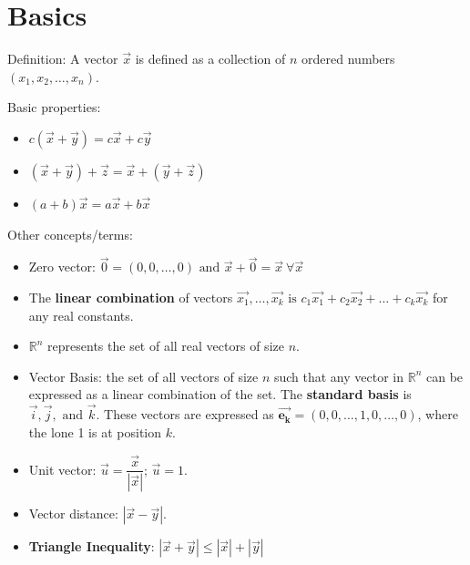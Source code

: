 \documentclass[11pt]{article}
\begin{document}
\section{Basics}
	Definition: A vector $\vec{x}$ is defined as a collection of $n$ ordered numbers $(x_1, x_2,\ldots ,x_n)$.
	
	Basic properties:
	\begin{itemize}
		\item $c(\vec{x} + \vec{y}) = c\vec{x} + c\vec{y}$
		\item $(\vec{x} + \vec{y}) + \vec{z} = \vec{x} + (\vec{y} + \vec{z})$
		\item $(a+b)\vec{x} = a\vec{x} + b\vec{x}$
	\end{itemize}
	
	Other concepts/terms:
	\begin{itemize}
		\item Zero vector: $\vec{0} = (0, 0,\ldots , 0) \text{ and } \vec{x} + \vec{0} = \vec{x} \ \forall \vec{x}$
		\item The \textbf{linear combination} of vectors $\vec{x_1}, \ldots , \vec{x_k} \text{ is } c_1\vec{x_1} + c_2\vec{x_2} + \ldots + c_k\vec{x_k}$ for any real constants.
		\item $\mathbb{R}^n$ represents the set of all real vectors of size $n$.
		\item Vector Basis: the set of all vectors of size $n$ such that any vector in $\mathbb{R}^n$ can be expressed as a linear combination of the set. The \textbf{standard basis} is $\vec{i}, \vec{j}, \text{ and } \vec{k}$. These vectors are expressed as $\mathbf{\vec{e_k}} = (0, 0, \ldots , 1, 0, \ldots ,0)$, where the lone 1 is at position $k$.
		\item Unit vector: $\vec{u}=\dfrac{\vec{x}}{|\vec{x}|}$; $\vec{u} = 1$.
		\item Vector distance: $|\vec{x} - \vec{y}|$.
		\item \textbf{Triangle Inequality}: $|\vec{x} + \vec{y}| \leq |\vec{x}| + |\vec{y}|$
	\end{itemize}
	
\end{document}
